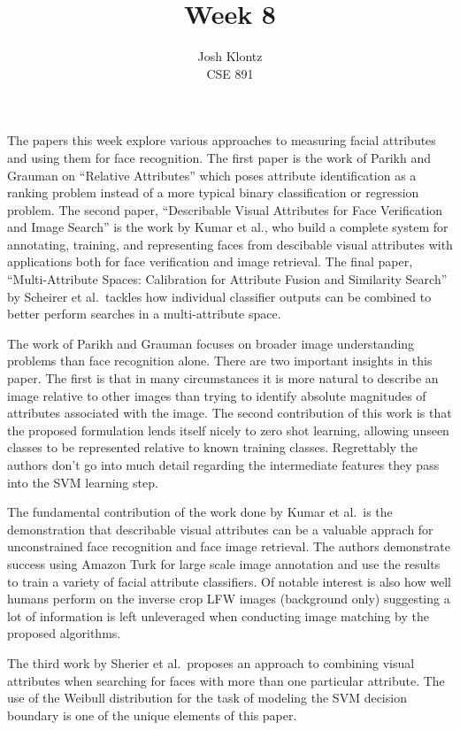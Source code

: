 \documentclass[12pt]{article}
\begin{document}
 
\title{Week 8}
\author{Josh Klontz\\CSE 891}
 
\maketitle
 
The papers this week explore various approaches to measuring facial attributes and using them for face recognition.
The first paper is the work of Parikh and Grauman on ``Relative Attributes'' which poses attribute identification as a ranking problem instead of a more typical binary classification or regression problem.
The second paper, ``Describable Visual Attributes for Face Verification and Image Search'' is the work by Kumar et al., who build a complete system for annotating, training, and representing faces from descibable visual attributes with applications both for face verification and image retrieval.
The final paper, ``Multi-Attribute Spaces: Calibration for Attribute Fusion and Similarity Search'' by Scheirer et al.\ tackles how individual classifier outputs can be combined to better perform searches in a multi-attribute space.
\par
The work of Parikh and Grauman focuses on broader image understanding problems than face recognition alone. There are two important insights in this paper. The first is that in many circumstances it is more natural to describe an image relative to other images than trying to identify absolute magnitudes of attributes associated with the image. The second contribution of this work is that the proposed formulation lends itself nicely to zero shot learning, allowing unseen classes to be represented relative to known training classes. Regrettably the authors don't go into much detail regarding the intermediate features they pass into the SVM learning step.
\par
The fundamental contribution of the work done by Kumar et al.\ is the demonstration that describable visual attributes can be a valuable apprach for unconstrained face recognition and face image retrieval. The authors demonstrate success using Amazon Turk for large scale image annotation and use the results to train a variety of facial attribute classifiers. Of notable interest is also how well humans perform on the inverse crop LFW images (background only) suggesting a lot of information is left unleveraged when conducting image matching by the proposed algorithms.
\par
The third work by Sherier et al.\ proposes an approach to combining visual attributes when searching for faces with more than one particular attribute. The use of the Weibull distribution for the task of modeling the SVM decision boundary is one of the unique elements of this paper.
\end{document}
